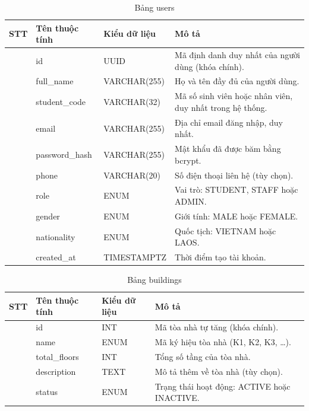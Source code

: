 \documentclass[13pt,a4paper]{extarticle}
\numberwithin{figure}{section}
\numberwithin{table}{section}
\begin{document}
	\begin{table}[H]
		\centering
		\caption{Bảng users}
		\label{tab:users}
		\begingroup
		\setlength{\tabcolsep}{3pt}
		\begin{tabularx}{\textwidth}{|>{\centering\arraybackslash}p{1cm}|>{\raggedright\arraybackslash}p{3.8cm}|>{\raggedright\arraybackslash}p{3.2cm}|Y|}
			\hline
			\centering\textbf{STT} & \centering\textbf{Tên thuộc tính} & \centering\textbf{Kiểu dữ liệu} & \centering\arraybackslash\textbf{Mô tả} \\
			 & id & UUID & Mã định danh duy nhất của người dùng (khóa chính). \\
			 & full\_name & VARCHAR(255) & Họ và tên đầy đủ của người dùng. \\
			 & student\_code & VARCHAR(32) & Mã số sinh viên hoặc nhân viên, duy nhất trong hệ thống. \\
			 & email & VARCHAR(255) & Địa chỉ email đăng nhập, duy nhất. \\
			 & password\_hash & VARCHAR(255) & Mật khẩu đã được băm bằng bcrypt. \\
			 & phone & VARCHAR(20) & Số điện thoại liên hệ (tùy chọn). \\
			 & role & ENUM & Vai trò: STUDENT, STAFF hoặc ADMIN. \\
			 & gender & ENUM & Giới tính: MALE hoặc FEMALE. \\
			 & nationality & ENUM & Quốc tịch: VIETNAM hoặc LAOS. \\
			 & created\_at & TIMESTAMPTZ & Thời điểm tạo tài khoản. \\
			\hline
		\end{tabularx}
		\endgroup
	\end{table}
	
	\begin{table}[H]
		\centering
		\caption{Bảng buildings}
		\label{tab:buildings}
		\begingroup
		\setlength{\tabcolsep}{3pt}
		\begin{tabularx}{\textwidth}{|>{\centering\arraybackslash}p{1cm}|>{\raggedright\arraybackslash}p{3.8cm}|>{\raggedright\arraybackslash}p{3.2cm}|Y|}
			\hline
			\centering\textbf{STT} & \centering\textbf{Tên thuộc tính} & \centering\textbf{Kiểu dữ liệu} & \centering\arraybackslash\textbf{Mô tả} \\
			 & id & INT & Mã tòa nhà tự tăng (khóa chính). \\
			 & name & ENUM & Mã ký hiệu tòa nhà (K1, K2, K3, \ldots). \\
			 & total\_floors & INT & Tổng số tầng của tòa nhà. \\
			 & description & TEXT & Mô tả thêm về tòa nhà (tùy chọn). \\
			 & status & ENUM & Trạng thái hoạt động: ACTIVE hoặc INACTIVE. \\
			\hline
		\end{tabularx}
		\endgroup
	\end{table}
	
\end{document}
